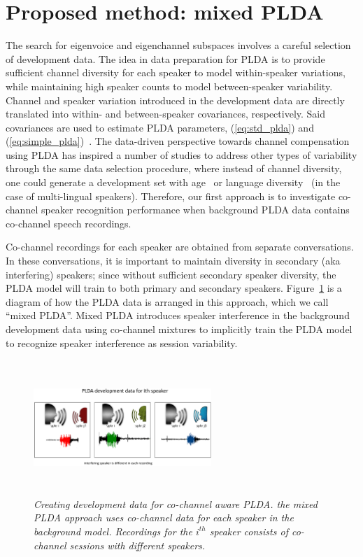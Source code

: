 \section{Proposed method: mixed PLDA}
\label{ssec:plda_data_prep}
The search for eigenvoice and eigenchannel subspaces involves a careful selection of development data. 
The idea in data preparation for PLDA is to provide sufficient channel diversity for each speaker to model within-speaker variations, while maintaining high speaker counts to model between-speaker variability. 
Channel and speaker variation introduced in the development data are directly translated into within- and between-speaker covariances, respectively. Said covariances are used to estimate PLDA parameters, (\ref{eq:std_plda}) and (\ref{eq:simple_plda})~\cite{sizov2014unifying}. 
The data-driven perspective towards channel compensation using PLDA has inspired a number of studies to address other types of variability through the same data selection procedure, where instead of channel diversity, one could generate a development set with age~\cite{kelly2013} or language diversity~\cite{misra2014languagemismatch} (in the case of multi-lingual speakers). 
Therefore, our first approach is to investigate co-channel speaker recognition performance when background PLDA data contains co-channel speech recordings. 

Co-channel recordings for each speaker are obtained from separate conversations. In these conversations, it is important to maintain diversity in secondary (aka interfering) speakers; since without sufficient secondary speaker diversity, the PLDA model will train to both primary and secondary speakers. 
Figure~\ref{fig:mixedPLDA_diagram} is a diagram of how the PLDA data is arranged in this approach, which we call ``mixed PLDA''. 
Mixed PLDA introduces speaker interference in the background development data using co-channel mixtures to implicitly train the PLDA model to recognize speaker interference as session variability. 


\begin{figure}[t!]
	\centering
	\vspace{0mm}
	\includegraphics[width=0.6\textwidth, height=2in]{figures/mixedPLDA_slide-crop}
	\vspace{0mm}
	\caption{\it \small Creating development data for co-channel aware PLDA. the mixed PLDA approach uses co-channel data for each speaker in the background model. Recordings for the $i^{th}$ speaker consists of co-channel sessions with different speakers.}
	\label{fig:mixedPLDA_diagram}
	\vspace{-3mm}
\end{figure}

